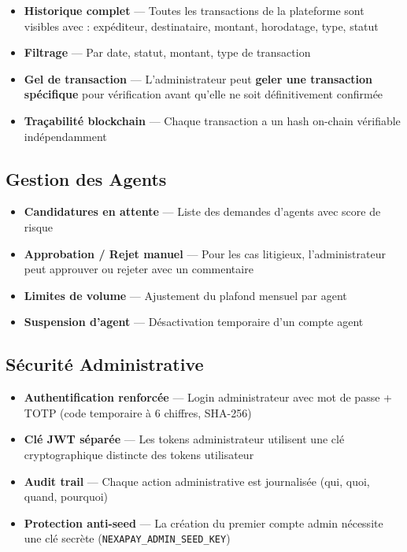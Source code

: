 \documentclass[11pt,a4paper]{article}
\begin{document}
\begin{itemize}[leftmargin=*]
    \item \textbf{Historique complet} --- Toutes les transactions de la plateforme sont visibles avec : exp\'editeur, destinataire, montant, horodatage, type, statut
    \item \textbf{Filtrage} --- Par date, statut, montant, type de transaction
    \item \textbf{Gel de transaction} --- L'administrateur peut \textbf{geler une transaction sp\'ecifique} pour v\'erification avant qu'elle ne soit d\'efinitivement confirm\'ee
    \item \textbf{Tra\c{c}abilit\'e blockchain} --- Chaque transaction a un hash on-chain v\'erifiable ind\'ependamment
\end{itemize}

\subsection{Gestion des Agents}

\begin{itemize}[leftmargin=*]
    \item \textbf{Candidatures en attente} --- Liste des demandes d'agents avec score de risque
    \item \textbf{Approbation / Rejet manuel} --- Pour les cas litigieux, l'administrateur peut approuver ou rejeter avec un commentaire
    \item \textbf{Limites de volume} --- Ajustement du plafond mensuel par agent
    \item \textbf{Suspension d'agent} --- D\'esactivation temporaire d'un compte agent
\end{itemize}

\subsection{S\'ecurit\'e Administrative}

\begin{itemize}[leftmargin=*]
    \item \textbf{Authentification renforc\'ee} --- Login administrateur avec mot de passe + TOTP (code temporaire \`a 6 chiffres, SHA-256)
    \item \textbf{Cl\'e JWT s\'epar\'ee} --- Les tokens administrateur utilisent une cl\'e cryptographique distincte des tokens utilisateur
    \item \textbf{Audit trail} --- Chaque action administrative est journalis\'ee (qui, quoi, quand, pourquoi)
    \item \textbf{Protection anti-seed} --- La cr\'eation du premier compte admin n\'ecessite une cl\'e secr\`ete (\texttt{NEXAPAY\_ADMIN\_SEED\_KEY})
\end{itemize}
\end{document}
